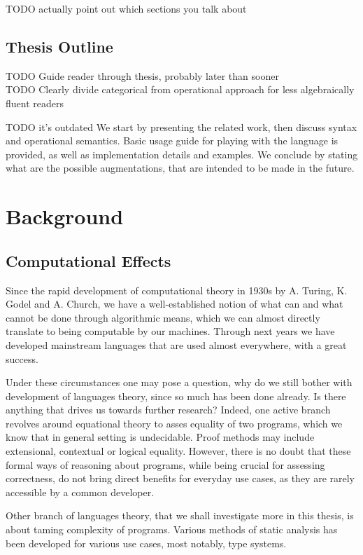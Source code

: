 \documentclass[declaration,shortabstract]{iithesis}
\theoremstyle{definition} \newtheorem{definition}{Definition}[chapter]
\theoremstyle{remark} \newtheorem{remark}[definition]{Observation}
\theoremstyle{plain} \newtheorem{theorem}[definition]{Theorem}
\theoremstyle{plain} \newtheorem{lemma}[definition]{Lemma}
\begin{document}
TODO actually point out which sections you talk about

\section{Thesis Outline}

TODO Guide reader through thesis, probably later than sooner \\
TODO Clearly divide categorical from operational approach for less algebraically fluent readers

TODO it's outdated
We start by presenting the related work,
then discuss syntax and operational semantics. Basic usage guide for playing with the
language is provided, as well as implementation details and examples. We conclude by
stating what are the possible augmentations, that are intended to be made in the future.

\chapter{Background}

\section{Computational Effects}

Since the rapid development of computational theory in 1930s by A. Turing,
K. Godel and A. Church, we have a well-established notion of what can and what
cannot be done through algorithmic means, which we can almost directly translate
to being computable by our machines. Through next years we have developed
mainstream languages that are used almost everywhere, with a great success.

Under these circumstances one may pose a question, why do we still bother with
development of languages theory, since so much has been done already. Is there
anything that drives us towards further research? Indeed, one active branch
revolves around equational theory to asses equality of two programs, which we
know that in general setting is undecidable. Proof methods may include extensional,
contextual or logical equality. However, there is no doubt that these formal
ways of reasoning about programs, while being crucial for assessing correctness,
do not bring direct benefits for everyday use cases, as they are rarely accessible
by a common developer.

Other branch of languages theory, that we shall investigate more in this thesis,
is about taming complexity of programs. Various methods of static analysis has
been developed for various use cases, most notably, type systems.
\end{document}
